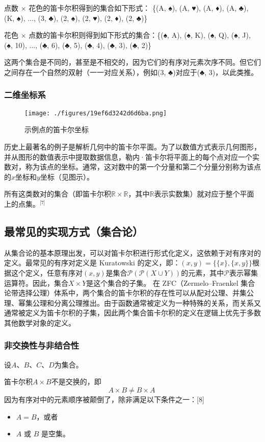 点数 × 花色的笛卡尔积得到的集合如下形式：  
\{(A, ♠), (A, ♥), (A, ♦), (A, ♣), (K, ♠), \(\ldots\), (3, ♣), (2, ♠), (2, ♥), (2, ♦), (2, ♣)\}

花色 × 点数的笛卡尔积则得到如下形式的集合：\{(♠, A), (♠, K), (♠, Q), (♠, J), (♠, 10), \(\ldots\), (♣, 6), (♣, 5), (♣, 4), (♣, 3), (♣, 2)\}

这两个集合是不同的，甚至是不相交的，因为它们的有序对元素次序不同。但它们之间存在一个自然的双射（一一对应关系），例如(3, ♣)对应于(♣, 3)，以此类推。
\subsubsection{二维坐标系}
\begin{figure}[ht]
\centering
\texttt{[image: ./figures/19ef6d3242d6d6ba.png]}
\caption{示例点的笛卡尔坐标} \label{fig_DKR_2}
\end{figure}
历史上最著名的例子是解析几何中的笛卡尔平面。为了以数值方式表示几何图形，并从图形的数值表示中提取数据信息，勒内·笛卡尔将平面上的每个点对应一个实数对，称为该点的坐标。通常，这对数中的第一个分量和第二个分量分别称为该点的\(x\)坐标和\(y\)坐标（见图示）。

所有这类数对的集合（即笛卡尔积\( \mathbb{R} \times \mathbb{R} \)，其中\( \mathbb{R} \)表示实数集）就对应于整个平面上的点集。\(^\text{[7]}\)
\subsection{最常见的实现方式（集合论）}  
从集合论的基本原理出发，可以对笛卡尔积进行形式化定义，这依赖于对有序对的定义。最常见的有序对定义是 Kuratowski 的定义，即：\((x, y) = \{\{x\}, \{x, y\}\}\)根据这个定义，任意有序对\( (x, y) \)是集合\(\mathcal{P}(\mathcal{P}(X \cup Y))\)的元素，其中\( \mathcal{P} \)表示幂集运算符。因此，集合\( X \times Y \)是这个集合的子集。
在 ZFC（Zermelo–Fraenkel 集合论带选择公理）体系中，两个集合的笛卡尔积的存在性可以从配对公理、并集公理、幂集公理和分离公理推出。由于函数通常被定义为一种特殊的关系，而关系又通常被定义为笛卡尔积的子集，因此两个集合笛卡尔积的定义在逻辑上优先于多数其他数学对象的定义。
\subsubsection{非交换性与非结合性} 
设\( A \)、\( B \)、\( C \)、\( D \)为集合。

笛卡尔积\( A \times B \)不是交换的，即  
\[
A \times B \ne B \times A~
\]  
因为有序对中的元素顺序被颠倒了，除非满足以下条件之一：[8]
\begin{itemize}
\item \( A = B \)，或者  
\item \( A \) 或 \( B \) 是空集。
\end{itemize}